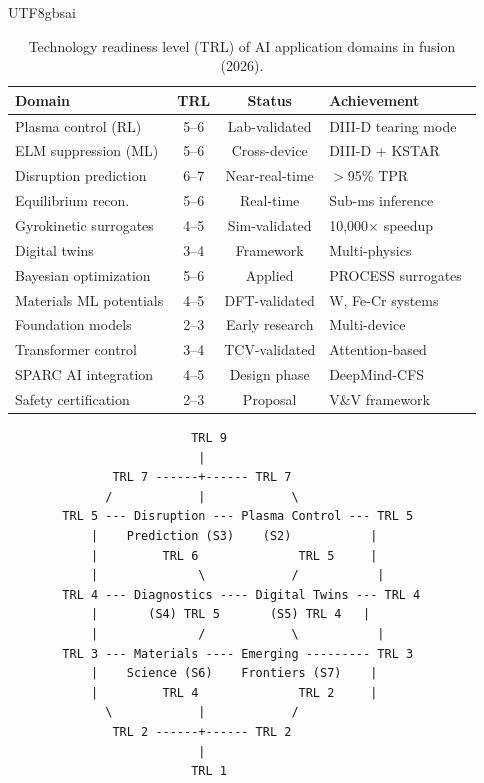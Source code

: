 \documentclass[12pt,a4paper]{article}
\begin{document}
\begin{CJK}{UTF8}{gbsai}
\begin{table}[htbp]
\centering
\caption{Technology readiness level (TRL) of AI application domains in fusion (2026).}
\label{tab:trl}
\begin{tabular}{lccl}
\toprule
Domain & TRL & Status & Achievement \\
\midrule
Plasma control (RL) & 5--6 & Lab-validated & DIII-D tearing mode~\citep{Seo2024Nature} \\
ELM suppression (ML) & 5--6 & Cross-device & DIII-D + KSTAR~\citep{Kim2024APSDPP} \\
Disruption prediction & 6--7 & Near-real-time & $>$95\% TPR~\citep{KatesHarbeck2019} \\
Equilibrium recon. & 5--6 & Real-time & Sub-ms inference~\citep{Matsumori2024} \\
Gyrokinetic surrogates & 4--5 & Sim-validated & 10,000$\times$ speedup~\citep{Ho2024} \\
Digital twins & 3--4 & Framework & Multi-physics~\citep{Chen2024DT} \\
Bayesian optimization & 5--6 & Applied & PROCESS surrogates~\citep{Griffiths2025} \\
Materials ML potentials & 4--5 & DFT-validated & W, Fe-Cr systems~\citep{Byggmastar2024} \\
Foundation models & 2--3 & Early research & Multi-device~\citep{Zhu2025} \\
Transformer control & 3--4 & TCV-validated & Attention-based~\citep{Pangioni2025} \\
SPARC AI integration & 4--5 & Design phase & DeepMind-CFS~\citep{CFS2025DeepMind} \\
Safety certification & 2--3 & Proposal & V\&V framework~\citep{Bozhenkov2024} \\
\bottomrule
\end{tabular}
\end{table}

\begin{figure}[htbp]
\centering
\small
\begin{verbatim}
                    TRL 9
                     |
         TRL 7 ------+------ TRL 7
        /            |            \
  TRL 5 --- Disruption --- Plasma Control --- TRL 5
      |    Prediction (S3)    (S2)           |
      |         TRL 6              TRL 5     |
      |              \            /           |
  TRL 4 --- Diagnostics ---- Digital Twins --- TRL 4
      |       (S4) TRL 5       (S5) TRL 4   |
      |              /            \           |
  TRL 3 --- Materials ---- Emerging --------- TRL 3
      |    Science (S6)    Frontiers (S7)    |
      |         TRL 4              TRL 2     |
        \            |            /
         TRL 2 ------+------ TRL 2
                     |
                    TRL 1


\end{verbatim}
\end{figure}
\end{CJK}
\end{document}
